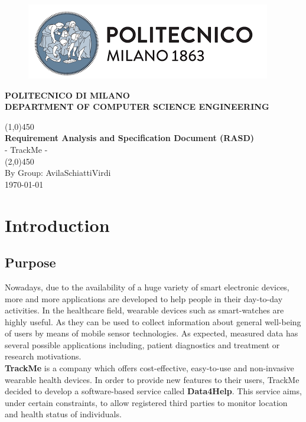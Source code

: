 \documentclass[12pt]{article}
\begin{document}
\begin{titlepage}
\begin{center}
\begin{figure}[h]
\includegraphics[scale=1]{PolimiLogo.png}
\centering
\end{figure}
\centering\textbf{POLITECNICO DI MILANO}\\
\centering\textbf{DEPARTMENT OF COMPUTER SCIENCE ENGINEERING}
\vspace*{4cm}

\line(1,0){450}\\
\Large{\textbf{Requirement Analysis and Specification Document (RASD)}}\\[3mm]
\Large{- TrackMe -}\\
\line(2,0){450}\\
\vfill
By Group: AvilaSchiattiVirdi\\


\today
\end{center}
\end{titlepage}

\tableofcontents
\thispagestyle{empty}
\newpage
\listoffigures
\listoftables
\thispagestyle{empty}
\clearpage
\setcounter{page}{1}

\section{Introduction}
\subsection{Purpose}
Nowadays, due to the availability of a huge variety of smart electronic devices, more and more applications are developed to help people in their day-to-day activities. In the healthcare field, wearable devices such as smart-watches are highly useful. As they can be used to collect information about general well-being of users by means of mobile sensor technologies. As expected, measured data has several possible applications including, patient diagnostics and treatment or research motivations. \\

\textbf{TrackMe} is a company which offers cost-effective, easy-to-use and non-invasive wearable health devices. In order to provide new features to their users, TrackMe decided to develop a software-based service called \textbf{Data4Help}. This service aims, under certain constraints, to allow registered third parties to monitor location and health status of individuals. \\
\end{document}
